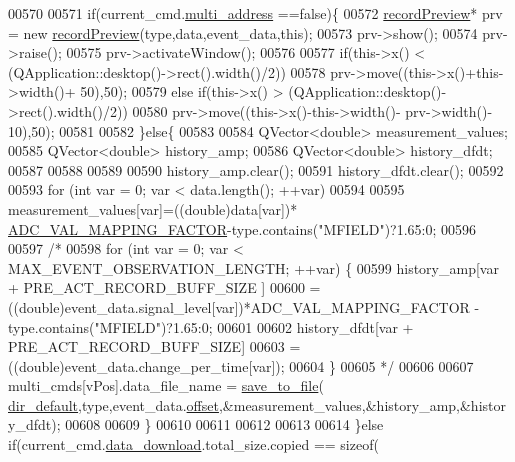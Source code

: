 \begin{DoxyCode}
00570 
00571         \textcolor{keywordflow}{if}(current\_cmd.\hyperlink{a00001_a8e69b971c61ced27a7567efd2bf0db59}{multi\_address} ==\textcolor{keyword}{false})\{
00572         \hyperlink{a00020}{recordPreview}* prv = \textcolor{keyword}{new} \hyperlink{a00020}{recordPreview}(type,data,event\_data,\textcolor{keyword}{this});
00573         prv->show();
00574         prv->raise();
00575         prv->activateWindow();
00576 
00577         \textcolor{keywordflow}{if}(this->x() < (QApplication::desktop()->rect().width()/2))
00578         prv->move((this->x()+this->width()+ 50),50);
00579         \textcolor{keywordflow}{else} \textcolor{keywordflow}{if}(this->x() > (QApplication::desktop()->rect().width()/2))
00580         prv->move((this->x()-this->width()- prv->width()- 10),50);
00581 
00582         \}\textcolor{keywordflow}{else}\{
00583 
00584             QVector<double> measurement\_values;
00585             QVector<double> history\_amp;
00586             QVector<double> history\_dfdt;
00587 
00588 
00589 
00590             history\_amp.clear();
00591             history\_dfdt.clear();
00592 
00593             \textcolor{keywordflow}{for} (\textcolor{keywordtype}{int} var = 0; var < data.length(); ++var)
00594 
00595                 measurement\_values[var]=((\textcolor{keywordtype}{double})data[var])*
      \hyperlink{a00031_ada92d3eeeec0cbeee41e76a52d145792}{ADC\_VAL\_MAPPING\_FACTOR}-type.contains(\textcolor{stringliteral}{"MFIELD"})?1.65:0;
00596 
00597 \textcolor{comment}{/*}
00598 \textcolor{comment}{            for (int var = 0; var < MAX\_EVENT\_OBSERVATION\_LENGTH; ++var) \{}
00599 \textcolor{comment}{                history\_amp[var + PRE\_ACT\_RECORD\_BUFF\_SIZE ]}
00600 \textcolor{comment}{                        =((double)event\_data.signal\_level[var])*ADC\_VAL\_MAPPING\_FACTOR -
       type.contains("MFIELD")?1.65:0;}
00601 \textcolor{comment}{}
00602 \textcolor{comment}{                history\_dfdt[var + PRE\_ACT\_RECORD\_BUFF\_SIZE]}
00603 \textcolor{comment}{                        =((double)event\_data.change\_per\_time[var]);}
00604 \textcolor{comment}{            \}}
00605 \textcolor{comment}{*/}
00606 
00607            multi\_cmds[vPos].data\_file\_name =  \hyperlink{a00006_a0114355b9f626345cf77d6f714f51468}{save\_to\_file}(
      \hyperlink{a00006_a2e107e43aeaccaf4c9a42254f13122c8}{dir\_default},type,event\_data.\hyperlink{a00003_a90588fed720ad404c18bcbb8fa84878e}{offset},&measurement\_values,&history\_amp,&history\_dfdt);
00608 
00609         \}
00610 
00611    
00612 
00613 
00614     \}\textcolor{keywordflow}{else} \textcolor{keywordflow}{if}(current\_cmd.\hyperlink{a00001_a5cfeaed4d4f8e51070a324c0ba893ebe}{data\_download}.total\_size.copied == \textcolor{keyword}{sizeof}(

\end{DoxyCode}
